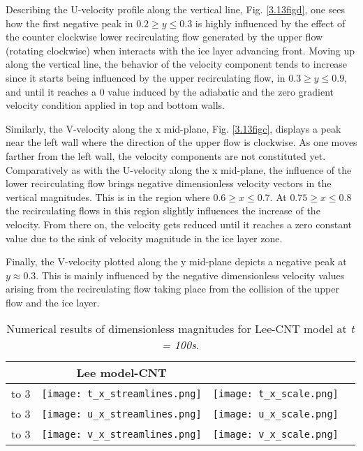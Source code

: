 \noindent Describing the U-velocity profile along the vertical line, Fig. \ref{3.13figd}, one sees how the first negative peak in $0.2 \ge y \leq 0.3$ is highly influenced by the effect of the counter clockwise lower recirculating flow generated by the upper flow (rotating clockwise) when interacts with the ice layer advancing front. Moving up along the vertical line, the behavior of the velocity component tends to increase since it starts being influenced by the upper recirculating flow, in $0.3 \ge y \leq 0.9$, and until it reaches a 0 value induced by the adiabatic and the zero gradient velocity condition applied in top and bottom walls.

\noindent Similarly, the V-velocity along the x mid-plane, Fig. \ref{3.13figc}, displays a peak near the left wall where the direction of the upper flow is clockwise. As one moves farther from the left wall, the velocity components are not constituted yet. Comparatively as with the U-velocity along the x mid-plane, the influence of the lower recirculating flow brings negative dimensionless velocity vectors in the vertical magnitudes. This is in the region where $0.6 \ge x \leq 0.7$. At $0.75 \ge x \leq 0.8$ the recirculating flows in this region slightly influences the increase of the velocity. From there on, the velocity gets reduced until it reaches a zero constant value due to the sink of velocity magnitude in the ice layer zone.

\noindent Finally, the V-velocity plotted along the y mid-plane depicts a negative peak at $y \approx 0.3$. This is mainly influenced by the negative dimensionless velocity values arising from the recirculating flow taking place from the collision of the upper flow and the ice layer.

\begin{table}[h!]
	\begin{tabular}{@{}b{2cm}ccc@{}}
		\toprule[1pt]
		& 
		\multicolumn{1}{c}{\textbf{Lee model-CNT}} & \\ \midrule[2pt]
		\vbox to 3\baselineskip{\textbf{Temperature}}& \texttt{[image: t\_x\_streamlines.png]} & \texttt{[image: t\_x\_scale.png]} \\		
		\vbox to 3\baselineskip{\textbf{U-velocity}}&\texttt{[image: u\_x\_streamlines.png]} & \texttt{[image: u\_x\_scale.png]}\\
		\vbox to 3\baselineskip{\textbf{V-velocity}}& \texttt{[image: v\_x\_streamlines.png]} & \texttt{[image: v\_x\_scale.png]} \\	 \bottomrule[1pt]		
	\end{tabular}
	\centering
	\caption{Numerical results of dimensionless magnitudes for Lee-CNT model at \textit{t = 100s}.}	
	\label{3.15tab}
\end{table}


